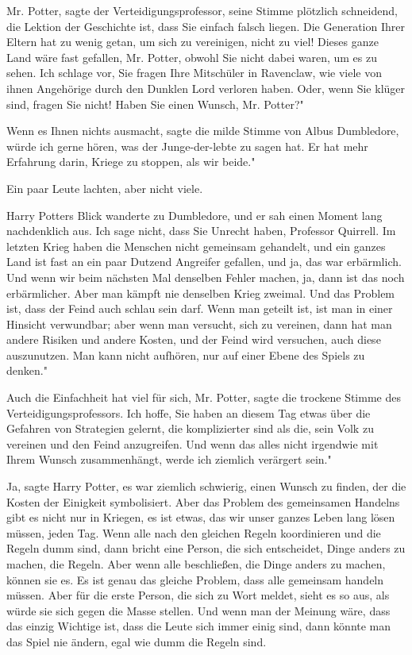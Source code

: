 \glqq{}Mr. Potter\grqq{}, sagte der Verteidigungsprofessor, seine Stimme
plötzlich schneidend, \glqq{}die Lektion der Geschichte ist, dass Sie einfach
falsch liegen. Die Generation Ihrer Eltern hat zu wenig getan, um sich zu
vereinigen, nicht zu viel! Dieses ganze Land wäre fast gefallen, Mr. Potter,
obwohl Sie nicht dabei waren, um es zu sehen. Ich schlage vor, Sie fragen Ihre
Mitschüler in Ravenclaw, wie viele von ihnen Angehörige durch den Dunklen Lord
verloren haben. Oder, wenn Sie klüger sind, fragen Sie nicht! Haben Sie einen
Wunsch, Mr. Potter?"

\glqq{}Wenn es Ihnen nichts ausmacht\grqq{}, sagte die milde Stimme von Albus
Dumbledore, \glqq{}würde ich gerne hören, was der Junge-der-lebte zu sagen hat.
Er hat mehr Erfahrung darin, Kriege zu stoppen, als wir beide."

Ein paar Leute lachten, aber nicht viele.

Harry Potters Blick wanderte zu Dumbledore, und er sah einen Moment lang
nachdenklich aus. \glqq{}Ich sage nicht, dass Sie Unrecht haben, Professor
Quirrell. Im letzten Krieg haben die Menschen nicht gemeinsam gehandelt, und ein
ganzes Land ist fast an ein paar Dutzend Angreifer gefallen, und ja, das war
erbärmlich. Und wenn wir beim nächsten Mal denselben Fehler machen, ja, dann ist
das noch erbärmlicher. Aber man kämpft nie denselben Krieg zweimal. Und das
Problem ist, dass der Feind auch schlau sein darf. Wenn man geteilt ist, ist man
in einer Hinsicht verwundbar; aber wenn man versucht, sich zu vereinen, dann hat
man andere Risiken und andere Kosten, und der Feind wird versuchen, auch diese
auszunutzen. Man kann nicht aufhören, nur auf einer Ebene des Spiels zu denken."

\glqq{}Auch die Einfachheit hat viel für sich, Mr. Potter\grqq{}, sagte die
trockene Stimme des Verteidigungsprofessors. \glqq{}Ich hoffe, Sie haben an
diesem Tag etwas über die Gefahren von Strategien gelernt, die komplizierter
sind als die, sein Volk zu vereinen und den Feind anzugreifen. Und wenn das
alles nicht irgendwie mit Ihrem Wunsch zusammenhängt, werde ich ziemlich
verärgert sein."

\glqq{}Ja\grqq{}, sagte Harry Potter, \glqq{}es war ziemlich schwierig, einen
Wunsch zu finden, der die Kosten der Einigkeit symbolisiert. Aber das Problem
des gemeinsamen Handelns gibt es nicht nur in Kriegen, es ist etwas, das wir
unser ganzes Leben lang lösen müssen, jeden Tag. Wenn alle nach den gleichen
Regeln koordinieren und die Regeln dumm sind, dann bricht eine Person, die sich
entscheidet, Dinge anders zu machen, die Regeln. Aber wenn alle beschließen, die
Dinge anders zu machen, können sie es. Es ist genau das gleiche Problem, dass
alle gemeinsam handeln müssen. Aber für die erste Person, die sich zu Wort
meldet, sieht es so aus, als würde sie sich gegen die Masse stellen. Und wenn
man der Meinung wäre, dass das einzig Wichtige ist, dass die Leute sich immer
einig sind, dann könnte man das Spiel nie ändern, egal wie dumm die Regeln sind.

